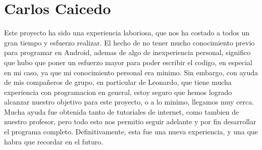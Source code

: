 \documentclass[10pt]{article}
\begin{document}
\section{Carlos Caicedo}
Este proyecto ha sido una experiencia laboriosa, que nos ha costado a todos un gran tiempo y esfuerzo realizar. El hecho de no tener mucho conocimiento previo para programar en
Android, ademas de algo de inexperiencia personal, significo que hubo que poner un esfuerzo mayor para poder escribir el codigo, en especial en mi caso, ya que mi conocimiento personal
era minimo. Sin embargo, con ayuda de mis compañeros de grupo, en particular de Leonardo, que tiene mucha experiencia con programacion en general, estoy seguro que hemos logrado
alcanzar nuestro objetivo para este proyecto, o a lo minimo, llegamos muy cerca. Mucha ayuda fue obtenida tanto de tutoriales de internet, como tambien de nuestro profesor, pero
todo esto nos permitio seguir adelante y por fin desarrollar el programa completo. Definitivamente, esta fue una nueva experiencia, y una que habra que recordar en el futuro.
		
\end{document}
